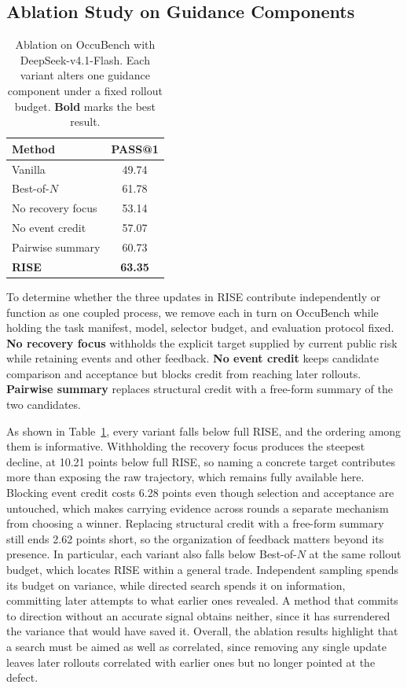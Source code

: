 \documentclass{article}
\newcommand{\method}{RISE\xspace}
\begin{document}
\subsection{Ablation Study on Guidance Components}
\begin{table}
\vspace{-14pt}
\centering
\small
\caption{Ablation on OccuBench with DeepSeek-v4.1-Flash. Each variant alters one guidance component under a fixed rollout budget. \textbf{Bold} marks the best result.}
\label{tab:ablation}
\setlength{\tabcolsep}{5pt}
\begin{tabular}{lc}
\toprule
Method & PASS@1 \\
\midrule
Vanilla & 49.74 \\
\mbox{Best-of-$N$} & 61.78 \\
\midrule
No recovery focus & 53.14 \\
No event credit & 57.07 \\
Pairwise summary & 60.73 \\
\midrule
\textbf{\method} & \textbf{63.35} \\
\bottomrule
\end{tabular}
\vspace{-12pt}
\end{table}
To determine whether the three updates in \method contribute independently or function as one coupled process, we remove each in turn on OccuBench while holding the task manifest, model, selector budget, and evaluation protocol fixed. \textbf{No recovery focus} withholds the explicit target supplied by current public risk while retaining events and other feedback. \textbf{No event credit} keeps candidate comparison and acceptance but blocks credit from reaching later rollouts. \textbf{Pairwise summary} replaces structural credit with a free-form summary of the two candidates.

As shown in Table~\ref{tab:ablation}, every variant falls below full \method, and the ordering among them is informative. Withholding the recovery focus produces the steepest decline, at 10.21 points below full \method, so naming a concrete target contributes more than exposing the raw trajectory, which remains fully available here. Blocking event credit costs 6.28 points even though selection and acceptance are untouched, which makes carrying evidence across rounds a separate mechanism from choosing a winner. Replacing structural credit with a free-form summary still ends 2.62 points short, so the organization of feedback matters beyond its presence. In particular, each variant also falls below \mbox{Best-of-$N$} at the same rollout budget, which locates \method within a general trade. Independent sampling spends its budget on variance, while directed search spends it on information, committing later attempts to what earlier ones revealed. A method that commits to direction without an accurate signal obtains neither, since it has surrendered the variance that would have saved it. Overall, the ablation results highlight that a search must be aimed as well as correlated, since removing any single update leaves later rollouts correlated with earlier ones but no longer pointed at the defect.
\end{document}
